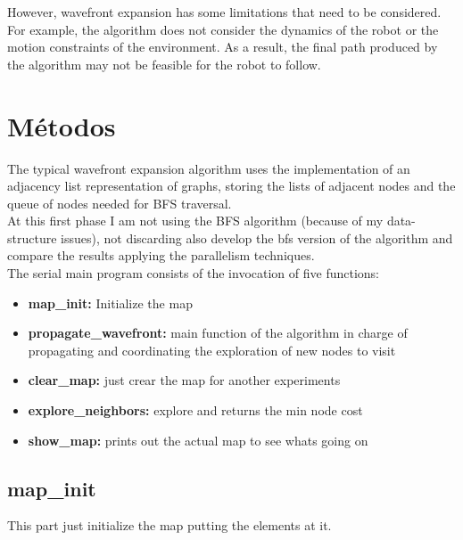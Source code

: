 \documentclass[oneside,twocolumn]{article}
\begin{document}
However, wavefront expansion has some limitations that need to be considered. For example, the algorithm does not consider the dynamics of the robot or the motion constraints of the environment. As a result, the final path produced by the algorithm may not be feasible for the robot to follow.


\newpage
\onecolumn
\section{Métodos}

The typical wavefront expansion algorithm uses the implementation of an adjacency list representation of graphs, storing the lists of adjacent nodes and the queue of nodes needed for BFS traversal.\\

At this first phase I am not using the BFS algorithm (because of my data-structure issues), not discarding also develop the bfs version of the algorithm and compare the results applying the parallelism techniques.\\

The serial main program consists of the invocation of five functions:

\begin{itemize}
\item \textbf{map\_init:} Initialize the map
\item \textbf{propagate\_wavefront:} main function of the algorithm in charge of propagating and coordinating the exploration of new nodes to visit
\item \textbf{clear\_map:} just crear the map for another experiments
\item \textbf{explore\_neighbors:} explore and returns the min node cost

\item \textbf{show\_map:} prints out the actual map to see whats going on
\end{itemize}

\subsection{map\_init}

This part just initialize the map putting the elements at it.
\end{document}
